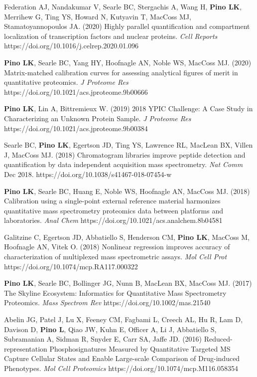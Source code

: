 \documentclass[11pt]{article}
\begin{document}
\begin{etaremune}
    \item Federation AJ, Nandakumar V, Searle BC, Stergachis A, Wang H, \textbf{Pino LK}, 
    Merrihew G, Ting YS, Howard N, Kutyavin T, MacCoss MJ, Stamatoyannopoulos JA. (2020) 
    Highly parallel quantification and compartment localization of transcription factors 
    and nuclear proteins. \textit{Cell Reports} 
    https://doi.org/10.1016/j.celrep.2020.01.096
    
    \item \textbf{Pino LK}, Searle BC, Yang HY, Hoofnagle AN, Noble WS, MacCoss MJ. 
    (2020) Matrix-matched calibration curves for assessing analytical figures of merit 
    in quantitative proteomics. \textit{J Proteome Res}
    https://doi.org/10.1021/acs.jproteome.9b00666

    \item \textbf{Pino LK}, Lin A, Bittremieux W. (2019) 2018 YPIC Challenge: A Case
    Study in Characterizing an Unknown Protein Sample. \textit{J Proteome Res}
    https://doi.org/10.1021/acs.jproteome.9b00384

    \item Searle BC, \textbf{Pino LK}, Egertson JD, Ting YS, Lawrence RL, MacLean BX,
    Villen J, MacCoss MJ. (2018) Chromatogram libraries improve peptide detection and 
    quantification by data independent acquisition mass spectrometry. \textit{Nat Comm} 
    Dec 2018. https://doi.org/10.1038/s41467-018-07454-w
    
    \item \textbf{Pino LK}, Searle BC, Huang E, Noble WS, Hoofnagle AN, MacCoss MJ. 
    (2018) Calibration using a single-point external reference material harmonizes 
    quantitative mass spectrometry proteomics data between platforms and laboratories. 
    \textit{Anal Chem} https://doi.org/10.1021/acs.analchem.8b04581
    
    \item Galitzine C, Egertson JD, Abbatiello S, Henderson CM, \textbf{Pino LK}, 
    MacCoss M, Hoofnagle AN, Vitek O. (2018) Nonlinear regression improves accuracy of 
    characterization of multiplexed mass spectrometric assays. \textit{Mol Cell Prot} 
    https://doi.org/10.1074/mcp.RA117.000322
    
    \item \textbf{Pino LK}, Searle BC, Bollinger JG, Nunn B, MacLean BX, MacCoss MJ. 
    (2017) The Skyline Ecosystem: Informatics for Quantitative Mass Spectrometry 
    Proteomics. \textit{Mass Spectrom Rev} https://doi.org/10.1002/mas.21540
    
    \item Abelin JG, Patel J, Lu X, Feeney CM, Fagbami L, Creech AL, Hu R, Lam D, Davison 
    D, \textbf{Pino L}, Qiao JW, Kuhn E, Officer A, Li J, Abbatiello S, Subramanian A, 
    Sidman R, Snyder E, Carr SA, Jaffe JD. (2016) Reduced-representation 
    Phosphosignatures Measured by Quantitative Targeted MS Capture Cellular States and 
    Enable Large-scale Comparison of Drug-induced Phenotypes. \textit{Mol Cell Proteomics} 
    https://doi.org/10.1074/mcp.M116.058354
    
\end{etaremune}
\end{document}
